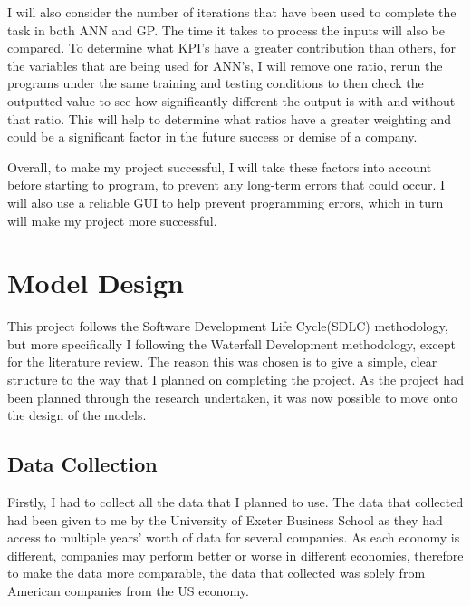 \documentclass[11pt]{article}
\begin{document}
I will also consider the number of iterations that have been used to complete the task in both ANN and GP. The time it takes to process the inputs will also be compared. To determine what KPI's have a greater contribution than others, for the variables that are being used for ANN's, I will remove one ratio, rerun the programs under the same training and testing conditions to then check the outputted value to see how significantly different the output is with and without that ratio. This will help to determine what ratios have a greater weighting and could be a significant factor in the future success or demise of a company. 

Overall, to make my project successful, I will take these factors into account before starting to program, to prevent any long-term errors that could occur. I will also use a reliable GUI to help prevent programming errors, which in turn will make my project more successful. 
\section{Model Design}
This project follows the Software Development Life Cycle(SDLC) methodology, but more specifically I following the Waterfall Development methodology, except for the literature review. The reason this was chosen is to give a simple, clear structure to the way that I planned on completing the project. As the project had been planned through the research undertaken, it was now possible to move onto the design of the models. 
\subsection{Data Collection}
Firstly, I had to collect all the data that I planned to use. The data that collected had been given to me by the University of Exeter Business School as they had access to multiple years' worth of data for several companies. As each economy is different, companies may perform better or worse in different economies, therefore to make the data more comparable, the data that collected was solely from American companies from the US economy.
\end{document}
